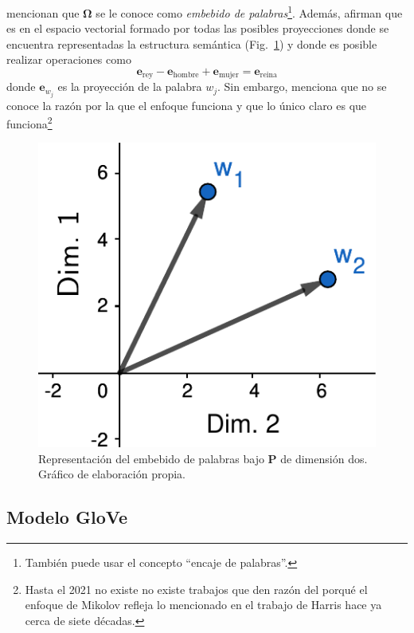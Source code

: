 \cite{bellegarda2016state} mencionan que $\mathbf{\Omega}$ se le conoce como \textit{embebido de palabras}\footnote{También puede usar el concepto ``encaje de palabras''.}. Además, afirman que es en el espacio vectorial formado por todas las posibles proyecciones donde se encuentra representadas la estructura semántica (Fig.~\ref{fig:word_embedding}) y donde es posible realizar operaciones como $$\mathbf{e}_{\mbox{rey}}-\mathbf{e}_{\mbox{hombre}}+\mathbf{e}_{\mbox{mujer}}=\mathbf{e}_{\mbox{reina}}$$ donde $\mathbf{e}_{w_j}$ es la proyección de la palabra $w_j$. Sin embargo, \cite{goldberg2014word2vec}  menciona que no se conoce la razón por la que el enfoque funciona y que lo único claro es que funciona\footnote{Hasta el 2021 no existe no existe trabajos que den razón del porqué el enfoque de Mikolov refleja lo mencionado en el trabajo de Harris hace ya cerca de siete décadas.}

\begin{figure}[h]
	\centering
	\includegraphics[width=0.7\linewidth]{img/word_embedding}
	\caption{Representación del embebido de palabras bajo $\mathbf{P}$ de dimensión dos. Gráfico de elaboración propia.}
	\label{fig:word_embedding}
\end{figure}

\subsection{Modelo GloVe}

